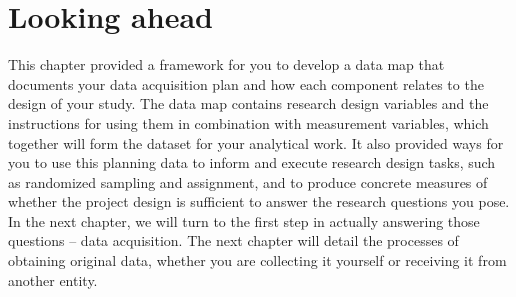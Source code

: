 \section{Looking ahead}
This chapter provided a framework for you to
develop a data map that documents your data acquisition plan and
how each component relates to the design of your study.
The data map contains research design variables and the instructions
for using them in combination with measurement variables, which together
will form the dataset for your analytical work.
It also provided ways for you to use this planning data
to inform and execute research design tasks,
such as randomized sampling and assignment,
and to produce concrete measures
of whether the project design is sufficient to answer the research questions you pose.
In the next chapter,
we will turn to the first step in actually answering those questions --
data acquisition.
The next chapter will detail the processes of obtaining
original data,
whether you are collecting it yourself or
receiving it from another entity.
